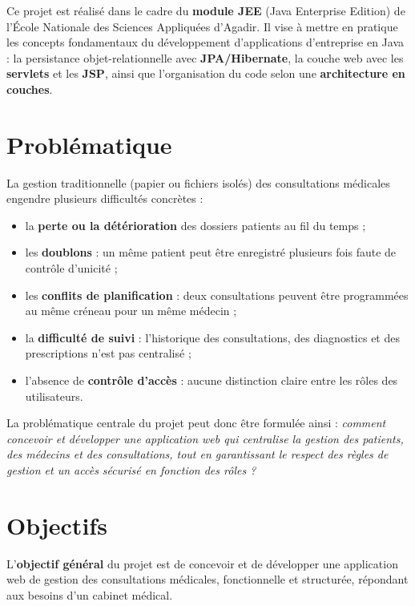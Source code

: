 Ce projet est réalisé dans le cadre du \textbf{module JEE} (Java Enterprise Edition) de l'École Nationale des Sciences Appliquées d'Agadir. Il vise à mettre en pratique les concepts fondamentaux du développement d'applications d'entreprise en Java : la persistance objet-relationnelle avec \textbf{JPA/Hibernate}, la couche web avec les \textbf{servlets} et les \textbf{JSP}, ainsi que l'organisation du code selon une \textbf{architecture en couches}.

\section{Problématique}

La gestion traditionnelle (papier ou fichiers isolés) des consultations médicales engendre plusieurs difficultés concrètes :

\begin{itemize}
    \item la \textbf{perte ou la détérioration} des dossiers patients au fil du temps ;
    \item les \textbf{doublons} : un même patient peut être enregistré plusieurs fois faute de contrôle d'unicité ;
    \item les \textbf{conflits de planification} : deux consultations peuvent être programmées au même créneau pour un même médecin ;
    \item la \textbf{difficulté de suivi} : l'historique des consultations, des diagnostics et des prescriptions n'est pas centralisé ;
    \item l'absence de \textbf{contrôle d'accès} : aucune distinction claire entre les rôles des utilisateurs.
\end{itemize}

La problématique centrale du projet peut donc être formulée ainsi : \emph{comment concevoir et développer une application web qui centralise la gestion des patients, des médecins et des consultations, tout en garantissant le respect des règles de gestion et un accès sécurisé en fonction des rôles ?}

\section{Objectifs}

L'\textbf{objectif général} du projet est de concevoir et de développer une application web de gestion des consultations médicales, fonctionnelle et structurée, répondant aux besoins d'un cabinet médical.

